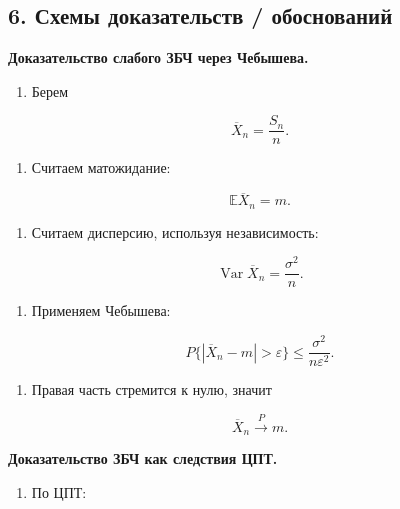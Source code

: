 \documentclass[
  11pt,
  a4paper,
]{article}
\providecommand{\tightlist}{%
  \setlength{\itemsep}{0pt}\setlength{\parskip}{0pt}}
\begin{document}
\subsection{6. Схемы доказательств /
обоснований}\label{ux441ux445ux435ux43cux44b-ux434ux43eux43aux430ux437ux430ux442ux435ux43bux44cux441ux442ux432-ux43eux431ux43eux441ux43dux43eux432ux430ux43dux438ux439}

\textbf{Доказательство слабого ЗБЧ через Чебышева.}

\begin{enumerate}
\def\labelenumi{\arabic{enumi}.}
\tightlist
\item
  Берем
\end{enumerate}

\[
\overline X_n=\frac{S_n}{n}.
\]

\begin{enumerate}
\def\labelenumi{\arabic{enumi}.}
\setcounter{enumi}{1}
\tightlist
\item
  Считаем матожидание:
\end{enumerate}

\[
\mathbb E\overline X_n=m.
\]

\begin{enumerate}
\def\labelenumi{\arabic{enumi}.}
\setcounter{enumi}{2}
\tightlist
\item
  Считаем дисперсию, используя независимость:
\end{enumerate}

\[
\operatorname{Var}\overline X_n
=
\frac{\sigma^2}{n}.
\]

\begin{enumerate}
\def\labelenumi{\arabic{enumi}.}
\setcounter{enumi}{3}
\tightlist
\item
  Применяем Чебышева:
\end{enumerate}

\[
P\{|\overline X_n-m|>\varepsilon\}
\le
\frac{\sigma^2}{n\varepsilon^2}.
\]

\begin{enumerate}
\def\labelenumi{\arabic{enumi}.}
\setcounter{enumi}{4}
\tightlist
\item
  Правая часть стремится к нулю, значит
\end{enumerate}

\[
\overline X_n\xrightarrow{P}m.
\]

\textbf{Доказательство ЗБЧ как следствия ЦПТ.}

\begin{enumerate}
\def\labelenumi{\arabic{enumi}.}
\tightlist
\item
  По ЦПТ:
\end{enumerate}
\end{document}
